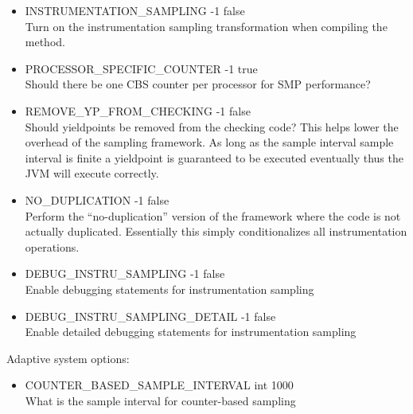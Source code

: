 \begin{itemize}

\item INSTRUMENTATION\_SAMPLING -1 false\\
Turn on the instrumentation sampling transformation when compiling the
method.

\item PROCESSOR\_SPECIFIC\_COUNTER -1 true\\
Should there be one CBS counter per processor for SMP performance?  

\item REMOVE\_YP\_FROM\_CHECKING -1 false\\
Should yieldpoints be removed from the checking code?  This helps
lower the overhead of the sampling framework.   As long as the
sample interval sample interval is finite a yieldpoint is guaranteed
to be executed eventually thus the JVM will execute correctly.  

\item NO\_DUPLICATION -1 false \\
Perform the ``no-duplication'' version of the framework where the code
is not actually duplicated.   Essentially this simply conditionalizes
all instrumentation operations.

\item DEBUG\_INSTRU\_SAMPLING -1 false \\
Enable debugging statements for instrumentation sampling

\item DEBUG\_INSTRU\_SAMPLING\_DETAIL -1 false\\
Enable detailed debugging statements for instrumentation sampling
\end{itemize}

Adaptive system options:

\begin{itemize}
\item COUNTER\_BASED\_SAMPLE\_INTERVAL int 1000\\
What is the sample interval for counter-based sampling
\end{itemize}



